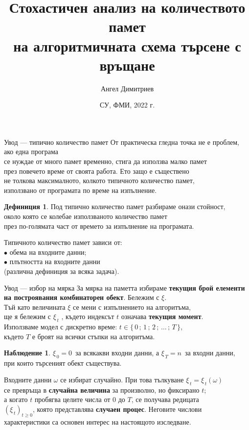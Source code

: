 \documentclass{beamer}
\title[Търсене с връщане]{Стохастичен анализ на количеството памет\\ на алгоритмичната схема търсене с връщане}
\author{Ангел Димитриев}
\date{СУ, ФМИ, 2022 г.}
\theoremstyle{definition}
\newtheorem{defn}[thm]{Дефиниция}
\newtheorem{nabl}[thm]{Наблюдение}
\theoremstyle{remark}
\begin{document}
\begin{frame}[plain]
	\maketitle
\end{frame}
\begin{frame}{Увод --- типично количество памет}
	От практическа гледна точка не е проблем, ако една програма\\
	се нуждае от много памет временно, стига да използва малко памет\\
   	през повечето време от своята работа. Ето защо е съществено\\
	не толкова максималното, колкото типичното количество памет,\\
	използвано от програмата по време на изпълнение.
	\begin{defn} 
		Под типично количество памет разбираме онази стойност,\\
		около която се колебае използваното количество памет\\
		през по-голямата част от времето за изпълнение на програмата.
	\end{defn}
	Типичното количество памет зависи от:\\
	$\bullet$ обема на входните данни;\\
	$\bullet$ плътността на входните данни\\ (различна дефиниция за всяка задача).
\end{frame}
\begin{frame}{Увод --- избор на мярка}
	За мярка на паметта избираме \textbf{текущия брой елементи}\\
	\textbf{на построявания комбинаторен обект}. Бележим с $\xi$.\\
	Тъй като величината  $\xi$ се мени с изпълнението на алгоритъма,\\
	ще я бележим с $\xi_{\,t}$ , където индексът $t$ означава \textbf{текущия момент}.\\
	Използваме модел с дискретно време: $t\in\{\,0\,;\,1\,;\,2\,;\,\ldots\,;\,T\,\}$,\\
	където $T$ е броят на всички стъпки на алгоритъма.
	\begin{nabl} 
		\mbox{$\xi_{\,0} = 0$}\, за всякакви входни данни, а
		\mbox{$\xi_{\,T} = n$}\, за входни данни,\\
		при които търсеният обект съществува.
	\end{nabl}			
	Входните данни $\omega$ се избират случайно. 
	При това тълкуване \mbox{$\xi_{\,t}=\xi_{\,t}(\omega)$}\\
	се превръща в \textbf{случайна величина} за произволно, но фиксирано $t$;\\
	а когато $t$ пробягва целите числа от $0$ до $T$,
	се получава редицата\\ \mbox{$\left(\xi_{\,t}\right)_{t\geq 0}$,}
	която представлява \textbf{случаен процес}.
	Неговите числови\\ характеристики
	са основен интерес на настоящото изследване.
\end{frame}
\end{document}
